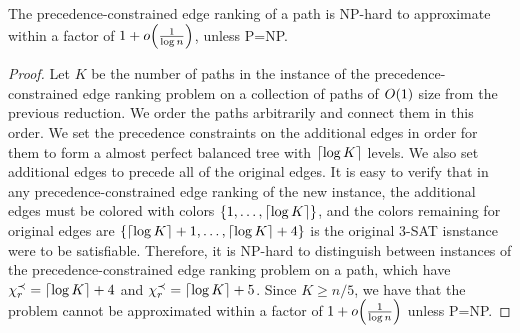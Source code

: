 \begin{theorem}
\label{thm:np-hardness}
The precedence-constrained edge ranking of a path is NP-hard to approximate within a factor of $1+o\mathopen{}\left( \frac{1}{\log n} \right)$, unless P=NP.
\end{theorem}
\begin{proof}
    Let $K$ be the number of paths in the instance of the precedence-constrained edge ranking problem on a collection of paths of $O\mathopen{}\left( 1 \right)$ size from the previous reduction. We order the paths arbitrarily and connect them in this order. We set the precedence constraints on the additional edges in order for them to form a almost perfect balanced tree with $\mathopen{}\left\lceil \log K \right\rceil$ levels. We also set additional edges to precede all of the original edges. It is easy to verify that in any precedence-constrained edge ranking of the new instance, the additional edges must be colored with colors $\mathopen{}\left\{ 1,\ldots,\mathopen{}\left\lceil \log K \right\rceil \right\}$, and the colors remaining for original edges are $\mathopen{}\left\{ \mathopen{}\left\lceil \log K \right\rceil+1,\ldots,\mathopen{}\left\lceil \log K \right\rceil+4 \right\}$ is the original 3-SAT isnstance were to be satisfiable. Therefore, it is NP-hard to distinguish between instances of the precedence-constrained edge ranking problem on a path, which have $\chi_r^{\prec}=\mathopen{}\left\lceil \log K \right\rceil+4$ and  $\chi_r^{\prec}=\mathopen{}\left\lceil \log K \right\rceil+5$. Since $K\geq n/5$, we have that the problem cannot be approximated within a factor of $1+o\mathopen{}\left( \frac{1}{\log n} \right)$ unless P=NP.
\end{proof}


